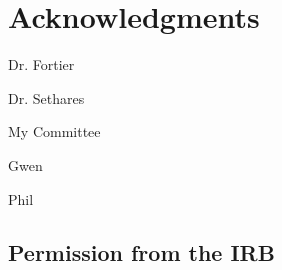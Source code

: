 \documentclass{umthesis}
\renewcommand{\cftchappresnum}{\chaptername\space} %
\begin{document}
\chapter*{Acknowledgments}             %
  Dr. Fortier
  
  Dr. Sethares
  
  My Committee
  
  Gwen
  
  Phil
  



\cleardoublepage
{}




\clearpage
\tableofcontents				 %
\clearpage
{}
{}
\listoffigures                  %



\mainmatter   %



\def \spo2{ \texorpdfstring{SpO$_{2}$}{SpO2}}













\begin{appendices}


\chapter{Permission from the IRB}




\end{appendices}
\backmatter  %




%


\end{document}
